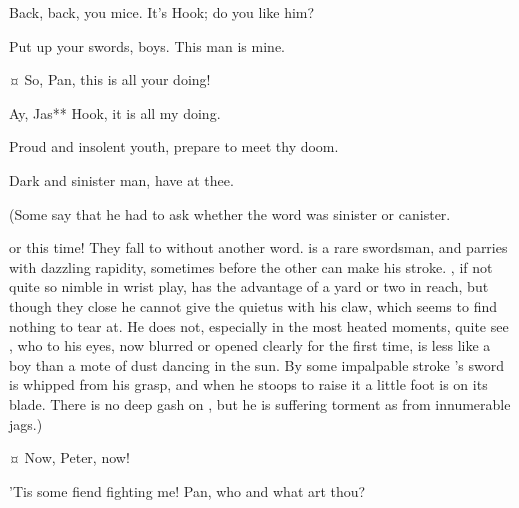 \begin{drama}

\hookspeaks
Back, back, you mice.
It's Hook; do you like him?

\peterspeaks
Put up your swords, boys.
This man is mine.


\hookspeaks {}¤
So, Pan, this is all your doing!

\peterspeaks
Ay, Jas** Hook, it is all my doing.

\hookspeaks
Proud and insolent youth, prepare to meet thy doom.

\peterspeaks
Dark and sinister man, have at thee.

\begin{stagedir}
(Some say that he had to ask \tootles whether the word was sinister or canister.

\hook or \peter this time!
They fall to without another word.
\peter is a rare swordsman, and parries with dazzling rapidity,
sometimes before the other can make his stroke.
\hook, if not quite so nimble in wrist play, has the advantage of a yard or two in reach,
but though they close he cannot give the quietus with his claw, which seems to find nothing to tear at.
He does not, especially in the most heated moments, quite see \peter,
who to his eyes, now blurred or opened clearly for the first time,
is less like a boy than a mote of dust dancing in the sun.
By some impalpable stroke \hook's sword is whipped from his grasp,
and when he stoops to raise it a little foot is on its blade.
There is no deep gash on \hook, but he is suffering torment as from innumerable jags.)
\end{stagedir}

 ¤
Now, Peter, now!


\hookspeaks
'Tis some fiend fighting me!
Pan, who and what art thou?


\end{drama}
